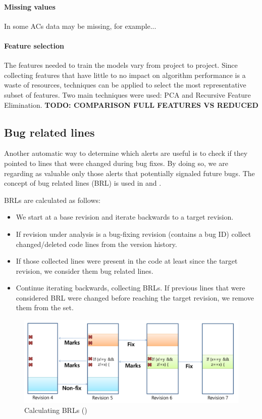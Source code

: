 \documentclass{article}
\begin{document}
\paragraph{Missing values} In some ACs data may be missing, for example...

\paragraph{Feature selection} The features needed to train the models vary from project to project. Since collecting features that have little to no impact on algorithm performance is a waste of resources, techniques can be applied to select the most representative subset of features. Two main techniques were used: PCA and Recursive Feature Elimination.
\textbf{TODO: COMPARISON FULL FEATURES VS REDUCED}

\subsection{Bug related lines}

Another automatic way to determine which alerts are useful is to check if they pointed to lines that were changed during bug fixes. By doing so, we are regarding as valuable only those alerts that potentially signaled future bugs. The concept of bug related lines (BRL) is used in \cite{which_warnings} and \cite{automatic_training_set}.

BRLs are calculated as follows:
\begin{itemize}
    \item We start at a base revision and iterate backwards to a target revision. 
    \item If revision under analysis is a bug-fixing revision (contains a bug ID) collect changed/deleted code lines from the version history.
    \item If those collected lines were present in the code at least since the target revision, we consider them bug related lines.
    \item Continue iterating backwards, collecting BRLs. If previous lines that were considered BRL were changed before reaching the target revision, we remove them from the set. 
\end{itemize}

\begin{figure}[H]
    \centering
    \includegraphics[scale=0.3]{./src/brl_example.png}
    \caption{Calculating BRLs (\cite{which_warnings})}
\end{figure}
\end{document}
